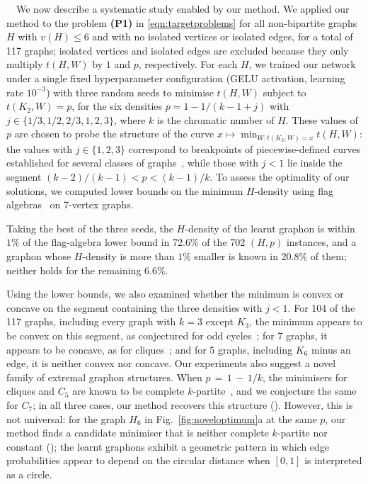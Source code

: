 \documentclass[11pt]{article}
\theoremstyle{plain}
\theoremstyle{definition}
\theoremstyle{remark}
\begin{document}
\ $\,$
We now describe a systematic study enabled by our method.
We applied our method to the problem \textbf{(P1)} in \eqref{eqn:targetproblems} for all non-bipartite graphs $H$ with $v(H) \le 6$ and with no isolated vertices or isolated edges, for a total of 117 graphs; isolated vertices and isolated edges are excluded because they only multiply $t(H, W)$ by $1$ and $p$, respectively.
For each $H$, we trained our network under a single fixed hyperparameter configuration (GELU activation, learning rate $10^{-3}$) with three random seeds to minimise $t(H,W)$ subject to $t(K_2,W)=p$, for the six densities $p = 1 - 1/(k-1+j)$ with $j \in \{1/3, 1/2, 2/3, 1, 2, 3\}$, where $k$ is the chromatic number of $H$.
These values of $p$ are chosen to probe the structure of the curve
$x \mapsto \min_{W:t(K_2,W)=x} t(H,W)$:
the values with $j \in \{1, 2, 3\}$ correspond to breakpoints of piecewise-defined curves established for several classes of graphs~\citep{razborov2008minimal,reiher2016clique,bennett2020minimizing}, while those with $j < 1$ lie inside the segment $(k-2)/(k-1) < p < (k-1)/k$.
To assess the optimality of our solutions, we computed lower bounds on the minimum $H$-density using flag algebras~\citep{razborov2007flag} on $7$-vertex graphs.

Taking the best of the three seeds, the $H$-density of the learnt graphon is within $1\%$ of the flag-algebra lower bound in 72.6\% of the 702 $(H,p)$ instances, and a graphon whose $H$-density is more than $1\%$ smaller is known in 20.8\% of them; neither holds for the remaining 6.6\%.

Using the lower bounds, we also examined whether the minimum is convex or concave on the segment containing the three densities with $j < 1$. For 104 of the 117 graphs, including every graph with $k = 3$ except $K_3$, the minimum appears to be convex on this segment, as conjectured for odd cycles~\citep{bennett2020minimizing}; for 7 graphs, it appears to be concave, as for cliques~\citep{reiher2016clique}; and for 5 graphs, including $K_6$ minus an edge, it is neither convex nor concave.
Our experiments also suggest a novel family of extremal graphon structures. When $p \,{=}\, 1 \,{-}\, 1/k$, the minimisers for cliques and $C_5$ are known to be complete $k$-partite~\citep{reiher2016clique,bennett2020minimizing}, and we conjecture the same for $C_7$; in all three cases, our method recovers this structure (). However, this is not universal: for the graph $H_6$ in Fig.~\ref{fig:noveloptimum}a at the same $p$, our method finds a candidate minimiser that is neither complete $k$-partite nor constant (); the learnt graphons exhibit a geometric pattern in which edge probabilities appear to depend on the circular distance when $[0,1]$ is interpreted as a circle.
\end{document}
